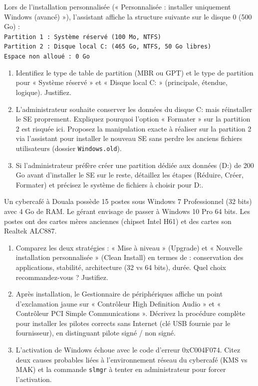 \documentclass[11pt]{article}
\begin{document}
\begin{exercice}
Lors de l'installation personnalisée (« Personnalisée : installer uniquement Windows (avancé) »), l'assistant affiche la structure suivante sur le disque 0 (500 Go) :\\
\texttt{Partition 1 : Système réservé (100 Mo, NTFS)}\\ 
\texttt{Partition 2 : Disque local C: (465 Go, NTFS, 50 Go libres)}\\ 
\texttt{Espace non alloué : 0 Go}
\begin{enumerate}
    \item Identifiez le type de table de partition (MBR ou GPT) et le type de partition pour « Système réservé » et « Disque local C: » (principale, étendue, logique). Justifiez.
    \item L'administrateur souhaite conserver les données du disque C: mais réinstaller le SE proprement. Expliquez pourquoi l'option « Formater » sur la partition 2 est risquée ici. Proposez la manipulation exacte à réaliser sur la partition 2 via l'assistant pour installer le nouveau SE sans perdre les anciens fichiers utilisateurs (dossier \texttt{Windows.old}).
    \item Si l'administrateur préfère créer une partition dédiée aux données (D:) de 200 Go avant d'installer le SE sur le reste, détaillez les étapes (Réduire, Créer, Formater) et précisez le système de fichiers à choisir pour D:.
\end{enumerate}
\end{exercice}

\begin{exercice}
Un cybercafé à Douala possède 15 postes sous Windows 7 Professionnel (32 bits) avec 4 Go de RAM. Le gérant envisage de passer à Windows 10 Pro 64 bits. Les postes ont des cartes mères anciennes (chipset Intel H61) et des cartes son Realtek ALC887.
\begin{enumerate}
    \item Comparez les deux stratégies : « Mise à niveau » (Upgrade) et « Nouvelle installation personnalisée » (Clean Install) en termes de : conservation des applications, stabilité, architecture (32 vs 64 bits), durée. Quel choix recommandez-vous ? Justifiez.
    \item Après installation, le Gestionnaire de périphériques affiche un point d'exclamation jaune sur « Contrôleur High Definition Audio » et « Contrôleur PCI Simple Communications ». Décrivez la procédure complète pour installer les pilotes corrects sans Internet (clé USB fournie par le fournisseur), en distinguant pilote signé / non signé.
    \item L'activation de Windows échoue avec le code d'erreur 0xC004F074. Citez deux causes probables liées à l'environnement réseau du cybercafé (KMS vs MAK) et la commande \texttt{slmgr} à tenter en administrateur pour forcer l'activation.
\end{enumerate}
\end{exercice}
\end{document}
